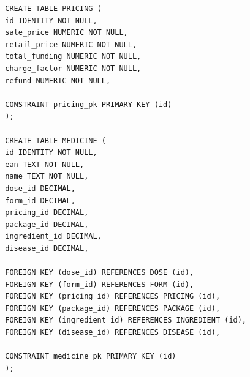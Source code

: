 \documentclass{article}
\begin{document}
    \begin{minipage}{.45\textwidth}
      \begin{lstlisting}
        CREATE TABLE PRICING (
        id IDENTITY NOT NULL,
        sale_price NUMERIC NOT NULL,
        retail_price NUMERIC NOT NULL,
        total_funding NUMERIC NOT NULL,
        charge_factor NUMERIC NOT NULL,
        refund NUMERIC NOT NULL,

        CONSTRAINT pricing_pk PRIMARY KEY (id)
        );

        CREATE TABLE MEDICINE (
        id IDENTITY NOT NULL,
        ean TEXT NOT NULL,
        name TEXT NOT NULL,
        dose_id DECIMAL,
        form_id DECIMAL,
        pricing_id DECIMAL,
        package_id DECIMAL,
        ingredient_id DECIMAL,
        disease_id DECIMAL,

        FOREIGN KEY (dose_id) REFERENCES DOSE (id),
        FOREIGN KEY (form_id) REFERENCES FORM (id),
        FOREIGN KEY (pricing_id) REFERENCES PRICING (id),
        FOREIGN KEY (package_id) REFERENCES PACKAGE (id),
        FOREIGN KEY (ingredient_id) REFERENCES INGREDIENT (id),
        FOREIGN KEY (disease_id) REFERENCES DISEASE (id),

        CONSTRAINT medicine_pk PRIMARY KEY (id)
        );
      \end{lstlisting}
    \end{minipage}
\end{document}
